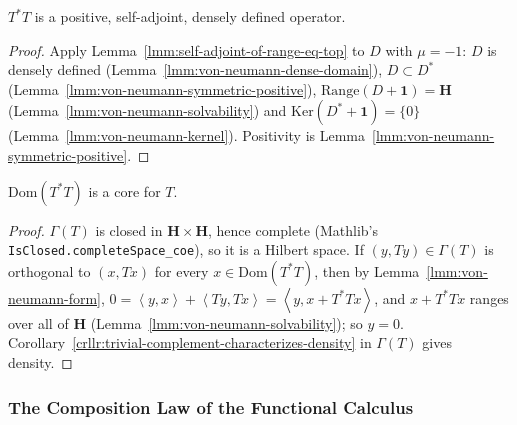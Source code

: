 \begin{theorem}
    \label{thrm:von-neumann-adjoint-product}
    \leanok
    $T^*T$ is a positive, self-adjoint, densely defined operator.
\end{theorem}
\begin{proof}
    \leanok
    Apply Lemma~\ref{lmm:self-adjoint-of-range-eq-top} to $D$ with $\mu = -1$: $D$ is densely defined (Lemma~\ref{lmm:von-neumann-dense-domain}), $D \subset D^*$ (Lemma~\ref{lmm:von-neumann-symmetric-positive}), $\text{Range}(D + \mathbf{1}) = \mathbf{H}$ (Lemma~\ref{lmm:von-neumann-solvability}) and $\text{Ker}(D^* + \mathbf{1}) = \{0\}$ (Lemma~\ref{lmm:von-neumann-kernel}). Positivity is Lemma~\ref{lmm:von-neumann-symmetric-positive}.
\end{proof}

\begin{lemma}
    \label{lmm:core-of-adjoint-product}
    \leanok
    $\text{Dom}(T^*T)$ is a core for $T$.
\end{lemma}
\begin{proof}
    \leanok
    $\Gamma(T)$ is closed in $\mathbf{H} \times \mathbf{H}$, hence complete (Mathlib's \texttt{IsClosed.completeSpace\_coe}), so it is a Hilbert space. If $(y, Ty) \in \Gamma(T)$ is orthogonal to $(x, Tx)$ for every $x \in \text{Dom}(T^*T)$, then by Lemma~\ref{lmm:von-neumann-form}, $0 = \left< y, x \right> + \left< Ty, Tx \right> = \left< y, x + T^*Tx \right>$, and $x + T^*Tx$ ranges over all of $\mathbf{H}$ (Lemma~\ref{lmm:von-neumann-solvability}); so $y = 0$. Corollary~\ref{crllr:trivial-complement-characterizes-density} in $\Gamma(T)$ gives density.
\end{proof}

\subsubsection{The Composition Law of the Functional Calculus}

